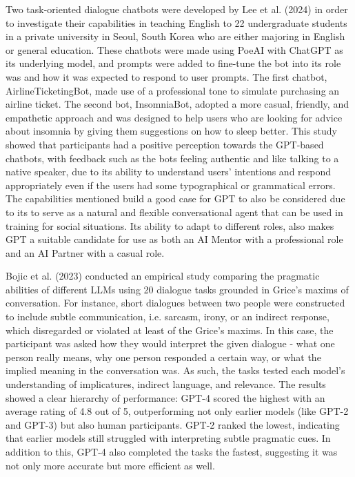 Two task-oriented dialogue chatbots were developed by Lee et al. (2024) in order to investigate their capabilities in teaching English to 22 undergraduate students in a private university in Seoul, South Korea who are either majoring in English or general education. These chatbots were made using PoeAI with ChatGPT as its underlying model, and prompts were added to fine-tune the bot into its role was and how it was expected to respond to user prompts. The first chatbot, AirlineTicketingBot, made use of a professional tone to simulate purchasing an airline ticket. The second bot, InsomniaBot, adopted a more casual, friendly, and empathetic approach and was designed to help users who are looking for advice about insomnia by giving them suggestions on how to sleep better. This study showed that participants had a positive perception towards the GPT-based chatbots, with feedback such as the bots feeling authentic and like talking to a native speaker, due to its ability to understand users’ intentions and respond appropriately even if the users had some typographical or grammatical errors. The capabilities mentioned build a good case for GPT to also be considered due to its to serve as a natural and flexible conversational agent that can be used in training for social situations. Its ability to adapt to different roles, also makes GPT a suitable candidate for use as both an AI Mentor with a professional role and an AI Partner with a casual role.

Bojic et al. (2023) conducted an empirical study comparing the pragmatic abilities of different LLMs using 20 dialogue tasks grounded in Grice’s maxims of conversation. For instance, short dialogues between two people were constructed to include subtle communication, i.e. sarcasm, irony, or an indirect response, which disregarded or violated at least of the Grice's maxims. In this case, the participant was asked how they would interpret the given dialogue - what one person really means, why one person responded a certain way, or what the implied meaning in the conversation was. As such, the tasks tested each model’s understanding of implicatures, indirect language, and relevance.  The results showed a clear hierarchy of performance: GPT-4 scored the highest with an average rating of 4.8 out of 5, outperforming not only earlier models (like GPT-2 and GPT-3) but also human participants. GPT-2 ranked the lowest, indicating that earlier models still struggled with interpreting subtle pragmatic cues. In addition to this, GPT-4 also completed the tasks the fastest, suggesting it was not only more accurate but more efficient as well.

